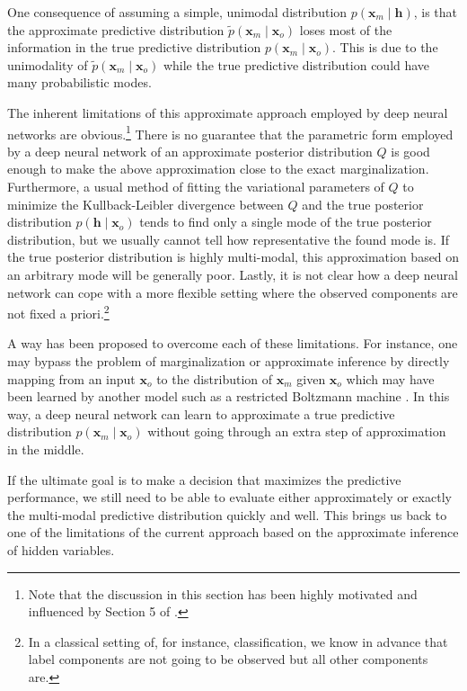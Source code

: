 \documentclass{now}
\newcommand{\vect}[1]{\mathbf{#1}}
\newcommand{\vh}[0]{\vect{h}}
\newcommand{\vx}[0]{\vect{x}}
\begin{document}
One consequence of 
assuming a simple, unimodal distribution $p(\vx_m \mid \vh)$, 
is that the
approximate predictive distribution $\tilde{p}(\vx_m \mid
\vx_o)$ loses most of the information in the true predictive
distribution $p(\vx_m \mid \vx_o)$. This is due to the
unimodality of 
$\tilde{p}(\vx_m \mid \vx_o)$ 
while the true
predictive distribution could have many probabilistic modes.

The inherent limitations of this approximate approach
employed by deep neural networks are obvious.\footnote{Note
that the discussion in this section has been highly
motivated and influenced by Section 5 of
\citep{Bengio2013future}.} There is no guarantee that the
parametric form employed by a deep neural network of an
approximate posterior distribution $Q$ is good enough to
make the above approximation close to the exact
marginalization.  Furthermore, a usual method of fitting the
variational parameters of $Q$ to minimize the
Kullback-Leibler divergence between $Q$ and the true
posterior distribution $p(\vh \mid \vx_o)$ tends to find
only a single mode of the true posterior distribution, but
we usually cannot tell how representative the found mode is.
If the true posterior distribution is highly multi-modal,
this approximation based on an arbitrary mode will be
generally poor.  Lastly, it is not clear how a deep neural
network can cope with a more flexible setting where the
observed components are not fixed a priori.\footnote{In a
classical setting of, for instance, classification, we know
in advance that label components are not going to be
observed but all other components are.}

A way has been proposed to overcome each of these
limitations. For instance, one may bypass the problem of
marginalization or approximate inference by directly mapping
from an input $\vx_o$ to the distribution of $\vx_m$ given
$\vx_o$ which may have been learned by another model such as
a restricted Boltzmann machine \citep{Mnih2011}. In this
way, a deep neural network can learn to approximate a true
predictive distribution $p(\vx_m \mid \vx_o)$ without going
through an extra step of approximation in the middle.

If the ultimate goal is to make a decision that maximizes the
predictive performance, we still need to be able to evaluate
either approximately or exactly the multi-modal predictive
distribution quickly and well. This brings us back to one of the
limitations of the current approach based on the approximate
inference of hidden variables.
\end{document}
